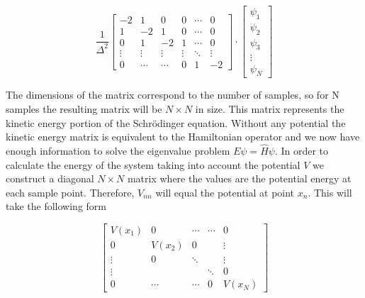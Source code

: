 \documentclass[authoryearcitations]{UoYCSproject}
\begin{document}
\begin{equation}
\frac{1}{\Delta ^2}\begin{bmatrix}
                -2     &   1    &     0    &     0   & \cdots & 0 \\
                1      &  -2    &     1    &     0   & \cdots & 0 \\
                0      &   1    &    -2    &     1   & \cdots & 0 \\
                \vdots & \vdots &   \vdots & \vdots  & \ddots & \vdots \\
                0      & \cdots &    \cdots     &     0   &    1   & -2
              \end{bmatrix}\cdot \begin{bmatrix} 
                                        \psi _1  \\
                                        \psi _{2}  \\
                                        \psi _{3} \\
                                        \vdots    \\
                                        \psi _{N} 
                                   \end{bmatrix}
\label{eq:kinetic}
\end{equation}

The dimensions of the matrix correspond to the number of samples, so for N samples the resulting matrix will be
$N \times N$ in size. This matrix represents the kinetic energy portion of the Schr\"{o}dinger equation. Without
any potential the kinetic energy matrix is equivalent to the Hamiltonian operator and we now have enough information
to solve the eigenvalue problem $E\psi = \hat{H}\psi$. In order to calculate the energy of the system taking into 
account the potential $V$ we construct a diagonal $N \times N$ matrix where the values are the potential energy at each sample
point. Therefore, $V_{nn}$ will equal the potential at point $x_{n}$. This will take the following form

\begin{equation}
\begin{bmatrix}
                V(x_1) &   0     &   \cdots & \cdots &     0 \\
                0      &  V(x_2) &    0     &        &  \vdots \\
                \vdots &   0     &   \ddots &        &  \vdots \\
                \vdots &         &          & \ddots &     0 \\
                0      & \cdots  &   \cdots &   0    &   V(x_N)
              \end{bmatrix}
\label{eq:potential}
\end{equation}
\end{document}
